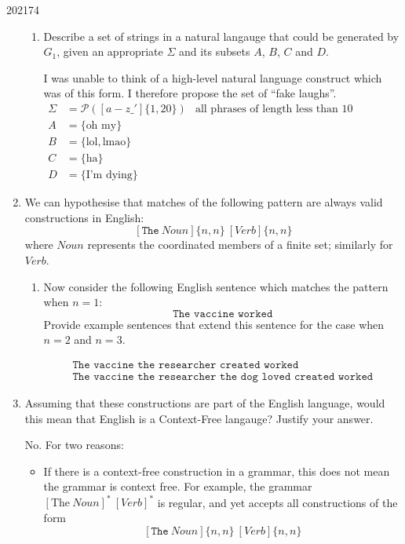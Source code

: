 \documentclass[10pt,\jkfside,a4paper]{article}
\begin{document}
\begin{examquestion}{2021}{7}{4}
\begin{enumerate}[label=(\alph*)]
\begin{enumerate}[label=(\roman*)]
\item Describe a set of strings in a natural langauge that could be
generated by $G_1$, given an appropriate $\Sigma$ and its subsets $A$, $B$,
$C$ and $D$.

I was unable to think of a high-level natural language construct which was
of this form. I therefore propose the set of ``fake laughs''.
\begin{align*}
\Sigma &= \mathcal P([a-z\_']\{1,20\}) & \text{all phrases of length less
than 10 characters} \\
A &= \{\text{oh my}\} \\
B &= \{\text{lol}, \text{lmao}\} \\
C &= \{\text{ha}\} \\
D &= \{\text{I'm dying}\}
\end{align*}

\end{enumerate}

\item We can hypothesise that matches of the following pattern are always
valid constructions in English:
\[
[\texttt{The}\ Noun]\{n, n\}\ [Verb]\{n, n\}
\]
where $Noun$ represents the coordinated members of a finite set; similarly
for $Verb$.

\begin{enumerate}[label=(\roman*)]

\item Now consider the following English sentence which matches the pattern
when $n = 1$:
\[
\texttt{The vaccine worked}
\]
Provide example sentences that extend this sentence for the case when $n =
2$ and $n = 3$.

\begin{gather*}
\texttt{The vaccine the researcher created worked} \\
\texttt{The vaccine the researcher the dog loved created worked}
\end{gather*}

\end{enumerate}

\item Assuming that these constructions are part of the English language,
would this mean that English is a Context-Free langauge? Justify your answer.

No. For two reasons:

\begin{itemize}

\item If there is a context-free construction in a grammar, this does not
mean the grammar is context free. For example, the grammar $[\text{The}\
Noun]^*\ [Verb]^*$ is regular, and yet accepts all constructions of the form
\[
[\texttt{The}\ Noun]\{n, n\}\ [Verb]\{n, n\}
\]


\end{itemize}
\end{enumerate}
\end{examquestion}
\end{document}
